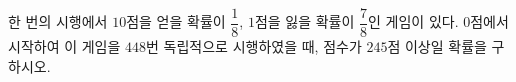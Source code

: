 한 번의 시행에서 $10$점을 얻을 확률이 $\dfrac{1}{8}$, $1$점을 잃을 확률이 $\dfrac{7}{8}$인 게임이 있다. $0$점에서 시작하여 이 게임을 $448$번 독립적으로 시행하였을 때, 점수가 $245$점 이상일 확률을 구하시오. 
